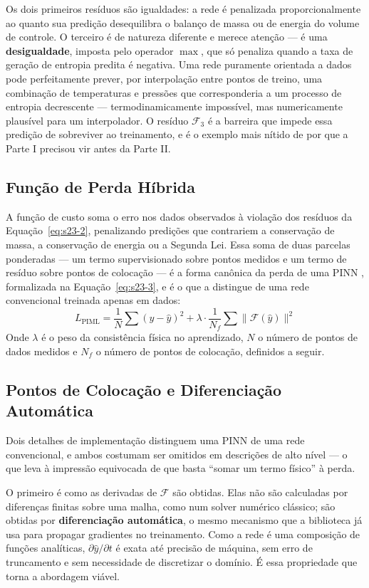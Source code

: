 \documentclass[12pt,a4paper]{article}
\numberwithin{equation}{section}
\numberwithin{table}{section}
\numberwithin{figure}{section}
\begin{document}
{	Os dois primeiros resíduos são igualdades: a rede é penalizada proporcionalmente ao quanto sua predição desequilibra o balanço de massa ou de energia do volume de controle. O terceiro é de natureza diferente e merece atenção — é uma \textbf{desigualdade}, imposta pelo operador $\max$, que só penaliza quando a taxa de geração de entropia predita é negativa. Uma rede puramente orientada a dados pode perfeitamente prever, por interpolação entre pontos de treino, uma combinação de temperaturas e pressões que corresponderia a um processo de entropia decrescente — termodinamicamente impossível, mas numericamente plausível para um interpolador. O resíduo $\mathcal{F}_3$ é a barreira que impede essa predição de sobreviver ao treinamento, e é o exemplo mais nítido de por que a Parte I precisou vir antes da Parte II.

	\subsection{Função de Perda Híbrida}
	A função de custo soma o erro nos dados observados à violação dos resíduos da Equação~\eqref{eq:s23-2}, penalizando predições que contrariem a conservação de massa, a conservação de energia ou a Segunda Lei. Essa soma de duas parcelas ponderadas — um termo supervisionado sobre pontos medidos e um termo de resíduo sobre pontos de colocação — é a forma canônica da perda de uma PINN \cite{piml}, formalizada na Equação~\eqref{eq:s23-3}, e é o que a distingue de uma rede convencional treinada apenas em dados:
	\begin{equation}\label{eq:s23-3}
 L_{\text{PIML}} = \frac{1}{N} \sum (y - \hat{y})^2 + \lambda \cdotp \frac{1}{N_f} \sum \| \mathcal{F}(\hat{y}) \|^2
\end{equation}
	Onde $\lambda$ é o peso da consistência física no aprendizado, $N$ o número de pontos de dados medidos e $N_f$ o número de pontos de colocação, definidos a seguir.

	\subsection{Pontos de Colocação e Diferenciação Automática}

	Dois detalhes de implementação distinguem uma PINN de uma rede convencional, e ambos costumam ser omitidos em descrições de alto nível — o que leva à impressão equivocada de que basta ``somar um termo físico'' à perda.

	O primeiro é como as derivadas de $\mathcal{F}$ são obtidas. Elas não são calculadas por diferenças finitas sobre uma malha, como num solver numérico clássico; são obtidas por \textbf{diferenciação automática}, o mesmo mecanismo que a biblioteca já usa para propagar gradientes no treinamento. Como a rede é uma composição de funções analíticas, $\partial \hat{y} / \partial t$ é exata até precisão de máquina, sem erro de truncamento e sem necessidade de discretizar o domínio. É essa propriedade que torna a abordagem viável.

}
\end{document}
